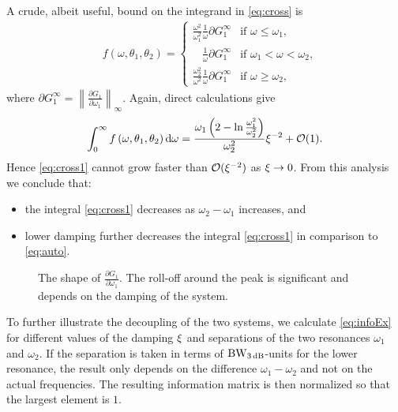 A crude, albeit useful, bound on the integrand in \eqref{eq:cross} is
\begin{align}
&f\left(\omega,\theta_1,\theta_2\right)=
  \begin{cases}
   \frac{\omega^2}{\omega_1^2}
   \frac{1}{\omega}
   \partial G_1^\infty
                                       & \text{if $\omega \leq \omega_1$,}\\
   \phantom{\frac{\omega^2}{\omega^2}}
   \frac{1}{\omega}
   \partial G_1^\infty
                                       & \text{if $\omega_1 < \omega < \omega_2$,}\\
   \frac{\omega_2^2}{\omega^2}
   \frac{1}{\omega}
   \partial G_1^\infty
                                       & \text{if $\omega \geq \omega_2$,}
  \end{cases}
\end{align}
where $\partial G_1^\infty = \left\|\frac{\partial G_1}{\partial \omega_1}\right\|_\infty$. Again, direct calculations give
\begin{align}
\int_0^\infty f\left(\omega,\theta_1,\theta_2\right)\mathrm{d}\omega = \frac{\omega_1\left(2-\ln{\frac{\omega_1^2}{\omega_2^2}}\right)}{\omega_2^2}\xi^{-2} + \mathcal{O}(1).
\end{align}
Hence \eqref{eq:cross1} cannot grow faster than $\mathcal{O}(\xi^{-2})$ as $\xi\rightarrow0$. From this analysis we conclude that:
\begin{itemize}
\item the integral \eqref{eq:cross1} decreases as $\omega_2-\omega_1$ increases, and
\item lower damping further decreases the integral \eqref{eq:cross1} in comparison to \eqref{eq:auto}.
\end{itemize}

\begin{figure}
\centering

\caption{The shape of $\frac{\partial G_1}{\partial \omega_1}$. The roll-off around the peak is significant and depends on the damping of the system.}
\label{fig:dG}
\end{figure}

To further illustrate the decoupling of the two systems, we calculate \eqref{eq:infoEx} for different values of the damping $\xi$ and separations of the two resonances $\omega_1$ and $\omega_2$. If the separation is taken in terms of $\mathrm{BW}_{3\,\mathrm{dB}}$-units for the lower resonance, the result only depends on the difference $\omega_1-\omega_2$ and not on the actual frequencies. The resulting information matrix is then normalized so that the largest element is $1$.

